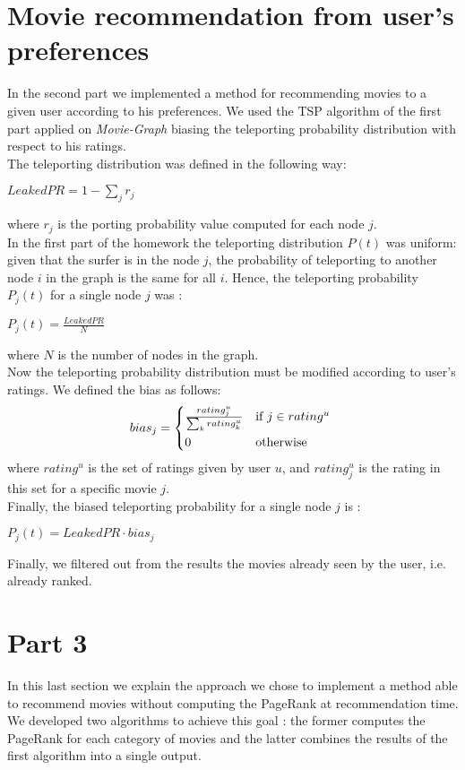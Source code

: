 \documentclass[11pt]{article}
\begin{document}
\section{Movie recommendation from user's preferences}
In the second part we implemented a method for recommending movies to a given user according to his preferences.
We used the TSP algorithm of the first part applied on \textit{Movie\--Graph} biasing the teleporting probability
distribution with respect to his ratings.\\
The teleporting distribution was defined in the following way: \\
\begin{center}
  $LeakedPR = 1 - \sum_{j}{r_j}$
\end{center}
where $r_j$ is the porting probability value computed for each node $j$.\\
In the first part of the homework the teleporting distribution $P(t)$ was uniform:
given that the surfer is in the node $j$, the probability of teleporting to another node $i$ in the graph is the same
for all $i$. Hence, the teleporting probability $P_{j}(t)$ for a single node $j$ was :
\begin{center}
  $P_{j}(t) = \frac{LeakedPR}{N}$
\end{center}
where $N$ is the number of nodes in the graph.\\
Now the teleporting probability distribution must be modified according to user's ratings. We defined the bias as follows:
\begin{equation}
    bias_{j} =
    \begin{cases*}
      \frac{rating^{u}_{j}}{\sum_{k}{rating^{u}_{k}}} & if $j \in rating^{u}$ \\
      0        & otherwise
    \end{cases*}
  \end{equation}
where $rating^{u}$ is the set of ratings given by user $u$, and $rating^{u}_{j}$ is the rating in this set for a specific
movie $j$. \\
Finally, the biased teleporting probability for a single node $j$ is :
\begin{center}
  $P_{j}(t) = LeakedPR \cdot bias_{j}$
\end{center}
Finally, we filtered out from the results the movies already seen by the user, i.e. already ranked.

\section{Part 3}
In this last section we explain the approach we chose to implement a method able to recommend movies without computing
the PageRank at recommendation time. We developed two algorithms to achieve this goal : the former computes the PageRank
for each category of movies and the latter combines the results of the first algorithm into a single output. \\
\end{document}

